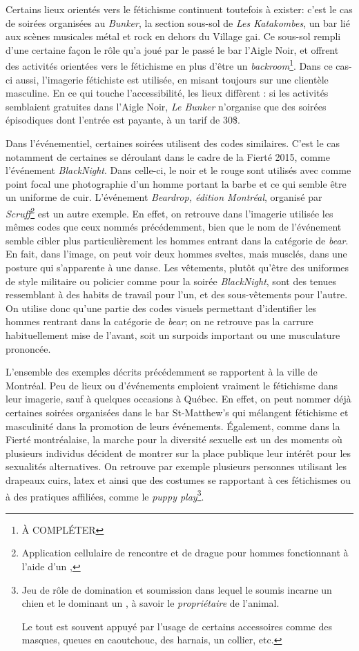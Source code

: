 Certains lieux orientés vers le fétichisme continuent toutefois à exister: c'est le cas de soirées organisées au \emph{Bunker}, la section sous-sol de \emph{Les Katakombes}, un bar lié aux scènes musicales métal et rock en dehors du Village gai.
Ce sous-sol rempli d'une certaine façon le rôle qu'a joué par le passé le bar l'Aigle Noir, et offrent des activités orientées vers le fétichisme en plus d'être un \emph{backroom}\footnote{À COMPLÉTER}.
Dans ce cas-ci aussi, l'imagerie fétichiste est utilisée, en misant toujours sur une clientèle masculine.
En ce qui touche l'accessibilité, les lieux diffèrent : si les activités semblaient gratuites dans l'Aigle Noir, \emph{Le Bunker} n'organise que des soirées épisodiques dont l'entrée est payante, à un tarif de 30\$.

Dans l'événementiel, certaines soirées utilisent des codes similaires.
C'est le cas notamment de certaines se déroulant dans le cadre de la Fierté 2015, comme l'événement  \emph{BlackNight}.
Dans celle-ci, le noir et le rouge sont utilisés avec comme point focal une photographie d'un homme portant la barbe et ce qui semble être un uniforme de cuir.
L'événement \emph{Beardrop, édition Montréal}, organisé par \emph{Scruff}\footnote{Application cellulaire de rencontre et de drague pour hommes fonctionnant à l'aide d'un \gps{} ,} est un autre exemple.
En effet, on retrouve dans l'imagerie utilisée les mêmes codes que ceux nommés précédemment, bien que le nom de l'événement semble cibler plus particulièrement les hommes entrant dans la catégorie de \emph{bear}.
En fait, dans l'image, on peut voir deux hommes sveltes, mais musclés, dans une posture qui s'apparente à une danse.
Les vêtements, plutôt qu'être des uniformes de style militaire ou policier comme pour la soirée \emph{BlackNight}, sont des tenues ressemblant à des habits de travail pour l'un, et des sous-vêtements pour l'autre.
On utilise donc qu'une partie des codes visuels permettant d'identifier les hommes rentrant dans la catégorie de \emph{bear}; on ne retrouve pas la carrure habituellement mise de l'avant, soit un surpoids important ou une musculature prononcée.

L'ensemble des exemples décrits précédemment se rapportent à la ville de Montréal.
Peu de lieux ou d'événements emploient vraiment le fétichisme dans leur imagerie, sauf à quelques occasions à Québec.
En effet, on peut nommer déjà certaines soirées organisées dans le bar St-Matthew's qui mélangent fétichisme et masculinité dans la promotion de leurs événements.
Également, comme dans la Fierté montréalaise, la marche pour la diversité sexuelle est un des moments où plusieurs individus décident de montrer sur la place publique leur intérêt pour les sexualités alternatives.
On retrouve par exemple plusieurs personnes utilisant les drapeaux cuirs, latex et \bdsm{} ainsi que des costumes se rapportant à ces fétichismes ou à des pratiques affiliées, comme le \emph{puppy play}\footnote{Jeu de rôle de domination et soumission dans lequel le soumis incarne un chien  et le dominant un , à savoir le \emph{propriétaire} de l'animal.
  
Le tout est souvent appuyé par l'usage de certains accessoires comme des masques, queues en caoutchouc, des harnais, un collier, etc.}.

